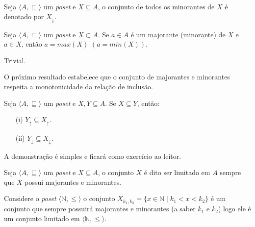 \begin{definicao}\label{def:ConjuntoDosMjnorantes}
	Seja $\langle A, \sqsubseteq \rangle$ um \textit{poset} e $X \subseteq A$, o conjunto de todos os minorantes de $X$ é denotado por $X_\downarrow$.
\end{definicao}

\begin{teorema}
	Seja $\langle A, \sqsubseteq \rangle$ um \textit{poset} e $X \subset A$. Se $a \in A$ é um majorante (minorante) de $X$ e $a \in X$, então $a = max(X)$ $(a = min(X))$.
\end{teorema}

\begin{prova}
	Trivial.
\end{prova}

O próximo resultado estabelece que o conjunto de majorantes e minorantes respeita a monotonicidade da relação de inclusão.

\begin{teorema}\label{teo:MonotonicidadeMajoranteMinorante}
	Seja $\langle A, \sqsubseteq \rangle$ um \textit{poset} e $X, Y \subseteq A$. Se $X \subseteq Y$, então: 
	\begin{itemize}
		\item[(i)] $Y_\uparrow \subseteq X_\uparrow$.
		\item[(ii)] $Y_\downarrow \subseteq X_\downarrow$.
	\end{itemize}
\end{teorema}

\begin{prova}
	A demonstração é simples e ficará como exercício ao leitor. 
\end{prova}

\begin{definicao}\label{def:ConjuntoLimitadoPoset}
	Seja $\langle A, \sqsubseteq \rangle$ um \textit{poset} e $X \subseteq A$, o conjunto $X$ é dito ser limitado em $A$ sempre que $X$ possui majorantes e minorantes.
\end{definicao}

\begin{exemplo}
	Considere o \textit{poset} $\langle \mathbb{N}, \leq \rangle$ o conjunto $X_{k_1, k_2} = \{x \in \mathbb{N} \mid k_1 < x < k_2\}$ é um conjunto que sempre possuirá majorantes e minorantes (a saber $k_1$ e $k_2$) logo ele é um conjunto limitado em $\langle \mathbb{N}, \leq \rangle$.
\end{exemplo}

